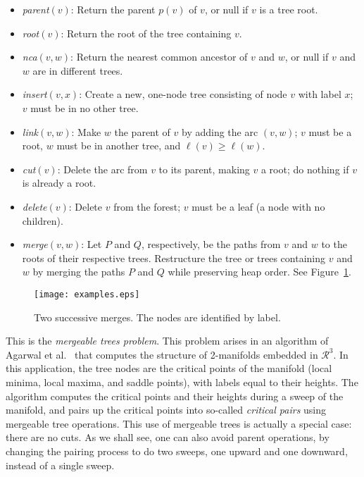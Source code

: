 \documentclass[twoside,leqno,twocolumn]{article}
\newcommand{\labeln}{\mathit{\ell}}
\begin{document}
\begin{itemize}
\vspace{-.75mm}
\addtolength{\itemsep}{-1.75mm}
\item {\em parent}$(v)$: Return the parent $p(v)$ of $v$, or null if $v$ is a tree root.
\item {\em root}$(v)$: Return the root of the tree containing $v$.
\item {\em nca}$(v,w)$: Return the nearest common ancestor of $v$ and $w$, or null if $v$ and $w$ are in different trees.
\item {\em insert}$(v, x)$: Create a new, one-node tree consisting of node $v$ with label $x$; $v$ must be in no other tree.
\item {\em link}$(v,w)$: Make $w$ the parent of $v$ by adding the arc $(v, w)$; $v$ must be a root, $w$ must be in another tree,
and $\labeln(v) \ge \labeln(w)$.
\item {\em cut}$(v)$: Delete the arc from $v$ to its parent, making $v$ a root; do nothing if $v$ is already a root.
\item {\em delete}$(v)$: Delete $v$ from the forest; $v$ must be a leaf (a node with no children).
\item {\em merge}$(v,w)$: Let $P$ and $Q$, respectively, be the paths from $v$ and $w$ to the roots of their respective trees.  Restructure the tree or trees containing $v$ and $w$ by merging the paths $P$ and $Q$ while preserving heap order. See Figure~\ref{fig:examples}.
\end{itemize}

\begin{figure}[h]
\addtolength{\abovecaptionskip}{-.5cm}
\begin{center}
\resizebox{1\textwidth}{!} {\texttt{[image: examples.eps]}}
\end{center}
\caption{\label{fig:examples} Two successive merges. The nodes are
identified by label.}
\end{figure}

This is the \emph{mergeable trees problem}.  This problem arises in an algorithm of Agarwal et al.~\cite{AEHW04,AEHW06} that computes the structure of 2-manifolds embedded in $\mathcal{R}^3$.  In this application, the tree nodes are the critical points of the manifold (local minima, local maxima, and saddle points), with labels equal to their heights.  The algorithm computes the critical points and their heights during a sweep of the manifold, and pairs up the critical points into so-called \emph{critical pairs} using mergeable tree operations.  This use of mergeable trees is actually a special case: there are no cuts.  As we shall see, one can also avoid parent operations, by changing the pairing process to do two sweeps, one upward and one downward, instead of a single sweep.
\end{document}
